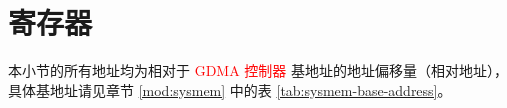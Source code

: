 \documentclass[main\_\_CN.tex]{subfiles}
\begin{document}





\clearpage
\section{寄存器}

本小节的所有地址均为相对于 \textcolor{red}{GDMA 控制器} 基地址的地址偏移量（相对地址），具体基地址请见章节 \ref{mod:sysmem} \textit{} 中的表 \ref{tab:sysmem-base-address}。


\end{document}
